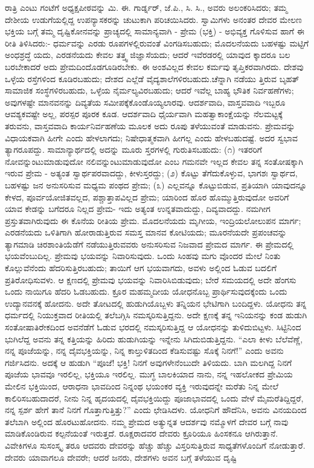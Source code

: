 ರಾತ್ರಿ ಎಂಟು ಗಂಟೆಗೆ ಅಧ್ಯಕ್ಷಪೀಠವನ್ನು ಮಿ. ಈ. ಗಾರ್ಡ್ನರ್, ಜೆ.ಪಿ., ಸಿ. ಸಿ., ಅವರು ಅಲಂಕರಿಸಿದರು; ತಮ್ಮ ದೇಶೀಯ ಉಡುಗೆಯಲ್ಲಿದ್ದ ಉಪನ್ಯಾಸಕರನ್ನು ಚುಟುಕಾಗಿ ಪರಿಚಯಿಸಿದರು. ಸ್ವಾಮಿಗಳು ಅನಂತರ ದೇವರ ಮೇಲಣ ಭಕ್ತಿಯ ಬಗ್ಗೆ ತಮ್ಮ ದೃಷ್ಟಿಕೋನವನ್ನು ಪ್ರಾಚ್ಯದಲ್ಲಿ ಸಾಮಾನ್ಯವಾಗಿ - ಪ್ರೇಮ (ಭಕ್ತಿ) - ಅಭಿವ್ಯಕ್ತ ಗೊಳಿಸುವ ಹಾಗೆ ಈ ರೀತಿ ತಿಳಿಸಿದರು:- ಧರ್ಮವನ್ನು ಎರಡು ರೂಪಗಳಲ್ಲಿರುವಂತೆ ವಿಂಗಡಿಸಬಹುದು; ಮೊದಲನೆಯದು ಬಹಳಷ್ಟು ಮಟ್ಟಿಗೆ ಅಂಧಶ್ರದ್ಧೆ ಯದು, ಎರಡನೆಯದು ಕೇವಲ ತತ್ತ್ವ ಜಿಜ್ಞಾಸೆಯದು; ಆದರೆ ಇವೆರಡರಲ್ಲಿ ಯಾವುದ ಕ್ಕಾದರೂ ಬಲ ಬರಬೇಕಾದರೆ ಅದು ಪ್ರೇಮದಿಂದೊಡಗೂಡಿರಬೇಕು. ಈ ಅಂಶವಿಲ್ಲದ ಕೇವಲ ಕರ್ಮವು ತೃಪ್ತಿಕರವಾಗಿರದು. ದೇಶವು ಒಳ್ಳೆಯ ರಸ್ತೆಗಳಿಂದ ಕೂಡಿರಬಹುದು; ದೇಶದ ಎಲ್ಲೆಡೆ ವೈದ್ಯಶಾಲೆಗಳಿರಬಹುದು.ಚೆನ್ನಾಗಿ ನಡೆಯು ತ್ತಿರುವ ಬೃಹತ್ ಸಾಮಾಜಿಕ ಸಂಸ್ಥೆಗಳಿರಬಹುದು, ಒಳ್ಳೆಯ ನೈರ್ಮಲ್ಯವಿರಬಹುದು; ಆದರೆ ಇವೆಲ್ಲ ಬಾಹ್ಯ ಭೌತಿಕ ನಿರ್ವಹಣೆಗಳು; ಅವುಗಳಷ್ಟೇ ಮಾನವನನ್ನು ದಿವ್ಯತೆಯ ಸಮೀಪಕ್ಕೆಕೊಂಡೊಯ್ಯಲಾರವು. ಆದರ್ಶವಾದಿ, ವಾಸ್ತವವಾದಿ ಇಬ್ಬರೂ ಆವಶ್ಯಕವಷ್ಟೇ ಅಲ್ಲ, ಪರಸ್ಪರ ಪೂರಕ ಕೂಡ. ಆದರ್ಶವಾದಿ ಧೈರ್ಯವಾಗಿ ಮಹತ್ವಾಕಾಂಕ್ಷೆಯನ್ನು ನೆಲಮಟ್ಟಕ್ಕೆ ತರುವನು, ವಾಸ್ತವವಾದಿ ಕಾರ್ಯನಿರ್ವಹಣೆಯ ಮೂಲಕ ಅದು ರೂಪು ತಳೆಯುವಂತೆ ಮಾಡುವನು. ಪ್ರೇಮವನ್ನು ವಿಧಾಯಕವಾಗಿ ಹೀಗೇ ಎಂದು ಹೇಳಲಾಗದು; ನಿಷೇಧಾತ್ಮಕವಾಗಿ ಹೀಗಲ್ಲ ಎಂದು ಹೇಳಬಹುದಷ್ಟೆ. ಅದರ ಸ್ವಭಾವ ತ್ಯಾಗರೂಪದ್ದು. ಸಾಮಾನ್ಯಾರ್ಥದಲ್ಲಿ ಅದನ್ನು ಮೂರು ಸ್ತರಗಳಲ್ಲಿ ಗುರುತಿಸಬಹುದು: (೧) ಇತರರಿಗೆ ನೋವನ್ನುಂಟುಮಾಡುವುದೋ ನಲಿವನ್ನುಂಟುಮಾಡುವುದೋ ಎಂಬ ಗಮನವೇ ಇಲ್ಲದ ಕೇವಲ ತನ್ನ ಸಂತೋಷಕ್ಕಾಗಿ ಇರುವ ಪ್ರೇಮ - ಅತ್ಯಂತ ಸ್ವಾರ್ಥಪರವಾದದ್ದು, ಕೀಳುಸ್ತರದ್ದು; (೨) ಕೊಟ್ಟು ತೆಗೆದುಕೊಳ್ಳುವ, ಭಾಗಶಃ ಸ್ವಾರ್ಥದ, ಬಹಳಷ್ಟು ಜನ ಅನುಸರಿಸುವ ಮಧ್ಯಮ ಪಂಥದ ಪ್ರೇಮ; (೩) ಎಲ್ಲವನ್ನೂ ಕೊಟ್ಟುಬಿಡುವ, ಪ್ರತಿಯಾಗಿ ಯಾವುದನ್ನೂ ಕೇಳದ, ಪೂರ್ವಯೋಜಿತವಲ್ಲದ, ಪಶ್ಚಾತ್ತಾಪವಿಲ್ಲದ ಪ್ರೇಮ; ಯಾರಿಂದ ಹೊರ ಹೊಮ್ಮುತ್ತಿರುವುದೋ ಅವರಿಗೆ ಯಾವ ಕೇಡನ್ನು ಬಗೆದರೂ ನಿಲ್ಲದ ಪ್ರೇಮ- ಇದು ಅತ್ಯಂತ ಉನ್ನತವಾದುದ್ದು, ದಿವ್ಯವಾದದ್ದು. ನಮಗೀಗ ಪ್ರಸ್ತುತವಾಗಿರುವುದು ಈ ಕೊನೆಯ ರೀತಿಯ ಪ್ರೇಮ. ಮೊದಲನೆಯದು ಮೃಗೀಯ, ಇಂದ್ರಿಯಲೋಲುಪನ ಮಾರ್ಗ; ಎರಡನೆಯದು ಒಳಿತಿಗಾಗಿ ಹೋರಾಡುತ್ತಿರುವ ಸಮಸ್ತ ಮಾನವ ಕೋಟಿಯದು; ಮೂರನೆಯದೇ ಪ್ರಪಂಚವನ್ನು ತ್ಯಾಗಮಾಡಿ ಚಿರಶಾಂತಿಯೆಡೆಗೆ ನಡೆಯುತ್ತಿರುವವರು ಅನುಸರಿಸುವ ನಿಜವಾದ ಪ್ರೇಮದ ಮಾರ್ಗ. ಈ ಪ್ರೇಮದಲ್ಲಿ ಭಯವೆಂಬುದಿಲ್ಲ. ಪ್ರೇಮವು ಭಯವನ್ನು ನಿವಾರಿಸುವುದು. ಒಂದು ಸಿಂಹವು ಮಗು ವೊಂದರ ಮೇಲೆ ನಿಂತು ಕೊಲ್ಲುವೆನೆಂದು ಹೆದರಿಸುತ್ತಿರಬಹುದು; ತಾಯಿಗೆ ಆಗ ಭಯವಾಗದು, ಅವಳು ಅಲ್ಲಿಂದ ಓಡುವ ಬದಲಿಗೆ ಪ್ರತಿರೋಧಿಸುವಳು. ಆ ಕ್ಷಣದಲ್ಲಿ ಪ್ರೇಮವು ಭಯವನ್ನು ನಿವಾರಿಸಿಬಿಡುವುದು; ಬೇರೆ ಸಮಯದಲ್ಲಿ ಅದೇ ಹೆಂಗಸು ಒಂದು ನಾಯಿಗೂ ಹೆದರಿ ಓಡಬಹುದು. ಕ್ರೂರ ಮಹಮ್ಮದೀಯ ಯೋಧನೊಬ್ಬ ಪ್ರಾರ್ಥಿಸುವುದಕ್ಕೆಂದು ಒಂದು ಉದ್ಯಾನವನಕ್ಕೆ ಹೋದನು. ಅದೇ ತೋಟದಲ್ಲಿ ಹುಡುಗಿಯೊಬ್ಬಳು ತನ್ನಿಯನ ಭೇಟಿಗಾಗಿ ಬಂದಿದ್ದಳು. ಯೋಧನು ತನ್ನ ಧರ್ಮದಲ್ಲಿ ನಿಯುಕ್ತವಾದ ರೀತಿಯಲ್ಲಿ ತಲೆಬಗ್ಗಿಸಿ ನಮಸ್ಕರಿಸುತ್ತಿದ್ದನು. ಅದೇ ಕ್ಷಣಕ್ಕೆ ತನ್ನ ಇನಿಯನನ್ನು ಕಂಡ ಹುಡುಗಿ ಸಂತೋಷಾತಿರೇಕದಿಂದ ಅವನೆಡೆಗೆ ಓಡುವ ಭರದಲ್ಲಿ ನಮಸ್ಕರಿಸುತ್ತಿದ್ದ ಆ ಯೋಧನನ್ನು ತುಳಿದುಬಿಟ್ಟಳು. ಸಿಟ್ಟಿನಿಂದ ಭುಗಿಲೆದ್ದ ಅವನು ತನ್ನ ಕತ್ತಿಯನ್ನು ಹಿರಿದು ಹುಡುಗಿಯನ್ನು ಇನ್ನೇನು ಸಿಗಿದುಬಿಡುತ್ತಿದ್ದನು. “ಎಲಾ ಕೀಳು ಬೆಲೆವೆಣ್ಣೆ, ನನ್ನ ಪೂಜೆಯನ್ನು, ನನ್ನ ದೈವಭಕ್ತಿಯನ್ನು, ನಿನ್ನ ಕಾಲ್ತುಳಿತದಿಂದ ಕೆಡಿಸುವಷ್ಟು ಸೊಕ್ಕೆ ನಿನಗೆ!” ಎಂದು ಅವನು ಗರ್ಜಿಸಿದನು. ಅದಕ್ಕೆ ಆ ಹುಡುಗಿ “ಪೂಜೆ! ಭಕ್ತಿ! ನಿನಗೆ ಅವುಗಳೇನೆಂಬುದೇ ತಿಳಿಯದು. ಬಾಗಿ ಮಲಗಿದ್ದ ನಿನಗೆ ಪೂಜೆಯ ಭಾವವೂ ಇರಲಿಲ್ಲ, ಭಕ್ತಿಯೂ ಇರಲಿಲ್ಲ. ಮುಗ್ಧ ಬಾಲಕಿಯಾದ ನಾನು, ನನ್ನ ಇಹಲೋಕದ ಪ್ರೇಮಿಯ ಮೇಲಿನ ಭಕ್ತಿಯಿಂದ, ಆರಾಧನಾ ಭಾವದಿಂದ ನಿನ್ನಂಥ ಭಯಂಕರ ವ್ಯಕ್ತಿ ಇರುವುದನ್ನೇ ಮರೆತು ನಿನ್ನ ಮೇಲೆ ಕಾಲಿರಿಸಬಹುದಾದರೆ, ನೀನು ನಿನ್ನ ಹೃದಯದಲ್ಲಿ ದೈವಭಕ್ತಿಯಿದ್ದು ಪೂಜಾಭಾವದಲ್ಲಿ ಒಂದು ವೇಳೆ ಮೈಮರೆತಿದ್ದಿದ್ದರೆ, ನನ್ನ ಸ್ಪರ್ಶ ಹೇಗೆ ತಾನೆ ನಿನಗೆ ಗೊತ್ತಾಗುತ್ತಿತ್ತು?” ಎಂದು ಛೇಡಿಸಿದಳು. ಯೋಧನಿಗೆ ಹೌದೆನಿಸಿ, ಅವನು ವಿನಯದಿಂದ ತಲೆಬಾಗಿ ಅಲ್ಲಿಂದ ಹೊರಟುಹೋದನು. ನಮ್ಮ ಪ್ರೇಮದ ಅತ್ಯುನ್ನತ ಆದರ್ಶವು ನಮ್ಮೊಳಗೆ ದೇವರ ಬಗ್ಗೆ ನಾವು ಮಾಡಿಕೊಂಡಿರುವ ಕಲ್ಪನೆಯಂತೆ ಇರುತ್ತದೆ. ರೂಕ್ಷರಾದವರ ದೇವರು ಕ್ರೂರಿಯೂ ಹಿಂಸಕನೂ ಆಗಿರುತ್ತಾನೆ. ವಿವೇಕಿಗಳೂ ಸುಸಂಸ್ಕೃ ತರೂ ಆದವರು ದೇವರನ್ನು ಹೆಚ್ಚು ಹೆಚ್ಚು ವಿಸ್ತರಿಸುತ್ತಿರುವ ಸಾಧ್ಯತೆಗಳೊಂದಿಗೆ ನೋಡುತ್ತಾರೆ. ದೇವರು ಯಾವಾಗಲೂ ದೇವರೇ; ಆದರೆ ಜನರು, ದೇಶಗಳು ಅವನ ಬಗ್ಗೆ ತಳೆಯುವ ದೃಷ್ಟಿ 
